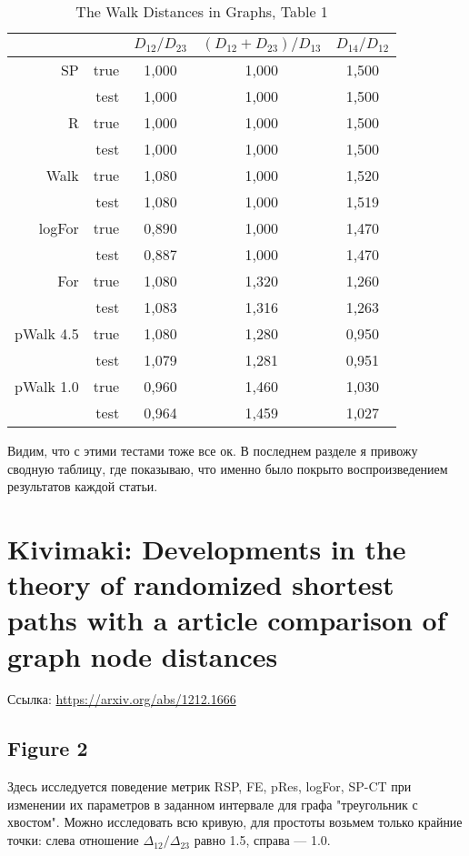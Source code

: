 \documentclass{article}
\begin{document}
\begin{table}[H]
\centering
\caption{The Walk Distances in Graphs, Table 1}
\label{my-label}
\begin{tabular}{rr|ccc}
          &      & $D_{12} / D_{23}$ & $(D_{12}+D_{23}) / D_{13}$ & $D_{14} / D_{12}$ \\
          \hline
SP        & true & 1,000 & 1,000 & 1,500 \\
          & test & 1,000 & 1,000 & 1,500 \\
          \cline{2-5}
R         & true & 1,000 & 1,000 & 1,500 \\
          & test & 1,000 & 1,000 & 1,500 \\
          \cline{2-5}
Walk      & true & 1,080 & 1,000 & 1,520 \\
          & test & 1,080 & 1,000 & 1,519 \\
          \cline{2-5}
logFor    & true & 0,890 & 1,000 & 1,470 \\
          & test & 0,887 & 1,000 & 1,470 \\
          \cline{2-5}
For       & true & 1,080 & 1,320 & 1,260 \\
          & test & 1,083 & 1,316 & 1,263 \\
          \cline{2-5}
pWalk 4.5 & true & 1,080 & 1,280 & 0,950 \\
          & test & 1,079 & 1,281 & 0,951 \\
          \cline{2-5}
pWalk 1.0 & true & 0,960 & 1,460 & 1,030 \\
          & test & 0,964 & 1,459 & 1,027 
\end{tabular}
\end{table}

Видим, что с этими тестами тоже все ок. В последнем разделе я привожу сводную таблицу, где показываю, что именно было покрыто воспроизведением результатов каждой статьи.


\section{Kivimaki: Developments in the theory of randomized shortest paths with a article comparison of graph node distances}
Ссылка: \url{https://arxiv.org/abs/1212.1666}

\subsection{Figure 2}
Здесь исследуется поведение метрик RSP, FE, pRes, logFor, SP-CT при изменении их параметров в заданном интервале для графа "треугольник с хвостом". Можно исследовать всю кривую, для простоты возьмем только крайние точки: слева отношение $\Delta_{12}/\Delta_{23}$ равно 1.5, справа --- 1.0.
\end{document}
